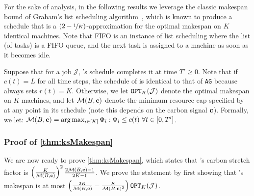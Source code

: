 For the sake of analysis, in the following results we leverage the classic makespan bound of Graham's list scheduling algorithm~\cite{Graham:66}, which is known to produce a schedule that is a $(2 - \nicefrac{1}{K})$-approximation for the optimal makespan on $K$ identical machines.  
Note that FIFO is an instance of list scheduling where the list (of tasks) is a FIFO queue, and the next task is assigned to a machine as soon as it becomes idle.

Suppose that for a job $\mathcal{J}$, \CAP's schedule completes it at time $T' \geq 0$.
Note that if $c(t) = L$ for all time steps, the schedule of \CAP is identical to that of \texttt{AG} because \CAP always sets $r(t) = K$.  Otherwise, we let $\texttt{OPT}_{K}(\mathcal{J})$ denote the optimal makespan on $K$ machines, and let $\mathcal{M}(B, {\mathbf{c}})$ denote the minimum resource cap specified by \CAP at any point in its schedule (note this depends on the carbon signal ${\mathbf{c}}$).  Formally, we let: $\mathcal{M}(B, {\mathbf{c}}) = \arg \max_{i\in[K]} \Phi_i : \Phi_i \le c(t) \ \forall t \in [0, T']$.

\subsubsection{\textbf{Proof of \autoref{thm:ksMakespan}}}\label{apx:ksMakespan}

We are now ready to prove \autoref{thm:ksMakespan}, which states that \CAP's
carbon stretch factor is $\left(\frac{K}{\mathcal{M}(B, {\mathbf{c}})}\right)^2 \frac{2\mathcal{M}(B, {\mathbf{c}})-1}{2K-1}$.
We prove the statement by first showing that \CAP's makespan is at most $\left( \frac{2K}{\mathcal{M}(B, {\mathbf{c}})} - \frac{K}{\mathcal{M}(B, {\mathbf{c}})^{2}} \right) \texttt{OPT}_{K}(\mathcal{J})$.

\smallskip

